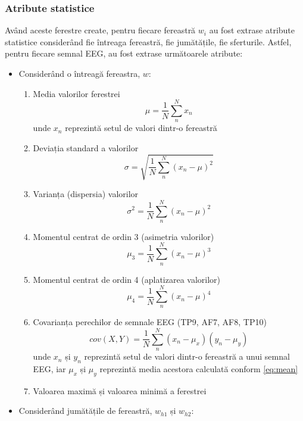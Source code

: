 \subsubsection*{Atribute statistice}
Având aceste ferestre create, pentru fiecare fereastră $w_i$ au fost extrase atribute statistice considerând fie întreaga fereastră, fie jumătățile, fie sferturile. Astfel, pentru fiecare semnal EEG, au fost extrase următoarele atribute:
\begin{itemize}
	\item Considerând o întreagă fereastra, $w$:
	\begin{enumerate}
	\item Media valorilor ferestrei
	\begin{equation}
	\mu = \frac{1}{N}\sum_n^N x_n
	\label{eq:mean}
	\end{equation}
	unde $x_n$ reprezintă setul de valori dintr-o fereastră
	\item Deviația standard a valorilor
	\begin{equation}
	\sigma = \sqrt{\frac{1}{N}\sum_n^N(x_n - \mu)^2}
	\end{equation}
	\item Varianța (dispersia) valorilor
	\begin{equation}
	\sigma^2 = \frac{1}{N}\sum_n^N(x_n - \mu)^2
	\end{equation}
	\item Momentul centrat de ordin 3 (asimetria valorilor) 
	\begin{equation}
	\mu_3 = \frac{1}{N}\sum_n^N(x_n - \mu)^3
	\end{equation}
	\item Momentul centrat de ordin 4 (aplatizarea valorilor)
	\begin{equation}
	\mu_4 = \frac{1}{N}\sum_n^N(x_n - \mu)^4
	\end{equation}
	\item Covarianța perechilor de semnale EEG (TP9, AF7, AF8, TP10)
	\begin{equation}
	cov(X,Y) = \frac{1}{N}\sum_n^N(x_n - \mu_x)(y_n - \mu_y)
	\end{equation}
	unde $x_n$ și $y_n$ reprezintă setul de valori dintr-o fereastră a unui semnal EEG, iar $\mu_x$ și $\mu_y$ reprezintă media acestora calculată conform \eqref{eq:mean}
	\item Valoarea maximă și valoarea minimă a ferestrei
	\end{enumerate}
	\item Considerând jumătățile de fereastră, $w_{h1}$ și $w_{h2}$:

\end{itemize}
